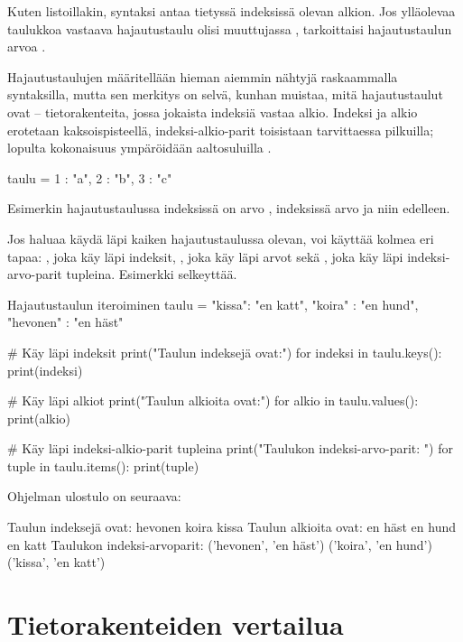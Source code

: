 Kuten listoillakin, syntaksi  antaa tietyssä indeksissä olevan alkion. Jos ylläolevaa taulukkoa vastaava hajautustaulu olisi muuttujassa ,  tarkoittaisi hajautustaulun arvoa .

Hajautustaulujen määritellään hieman aiemmin nähtyjä raskaammalla syntaksilla, mutta sen merkitys on selvä, kunhan muistaa, mitä hajautustaulut ovat -- tietorakenteita, jossa jokaista indeksiä vastaa alkio. Indeksi ja alkio erotetaan kaksoispisteellä, indeksi-alkio-parit toisistaan tarvittaessa pilkuilla; lopulta kokonaisuus ympäröidään aaltosuluilla \code{\{\}}.

\begin{python}
taulu = { 1 : "a", 2 : "b", 3 : "c" }
\end{python}

Esimerkin hajautustaulussa indeksissä  on arvo , indeksissä  arvo  ja niin edelleen.

Jos haluaa käydä läpi kaiken hajautustaulussa olevan, voi käyttää kolmea eri tapaa: , joka käy läpi indeksit, , joka käy läpi arvot sekä , joka käy läpi indeksi-arvo-parit tupleina. Esimerkki selkeyttää.

\begin{example}{Hajautustaulun iteroiminen}
taulu = { "kissa": "en katt", "koira" : "en hund", "hevonen" : "en häst"}

# Käy läpi indeksit
print("Taulun indeksejä ovat:")
for indeksi in taulu.keys():
	print(indeksi)

# Käy läpi alkiot
print("Taulun alkioita ovat:")
for alkio in taulu.values():
	print(alkio)

# Käy läpi indeksi-alkio-parit tupleina
print("Taulukon indeksi-arvo-parit: ")
for tuple in taulu.items():
	print(tuple)
\end{example}

Ohjelman ulostulo on seuraava:

\begin{output}
Taulun indeksejä ovat:
hevonen
koira
kissa
Taulun alkioita ovat:
en häst
en hund
en katt
Taulukon indeksi-arvoparit: 
('hevonen', 'en häst')
('koira', 'en hund')
('kissa', 'en katt')
\end{output}

\section{Tietorakenteiden vertailua}

